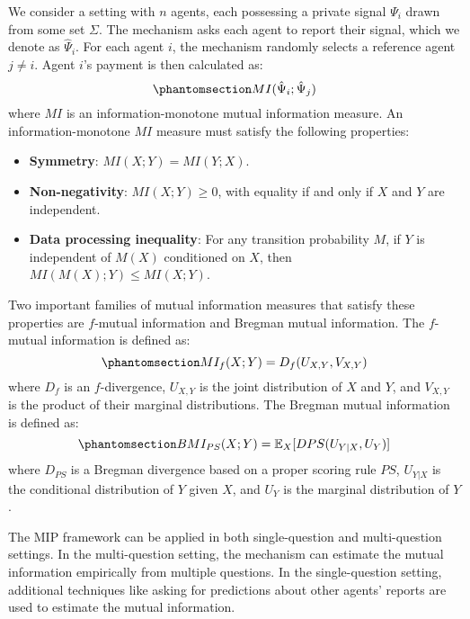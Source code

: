 \documentclass[
  letterpaper,
  numbers=noenddot,
  DIV=11]{scrreprt}
\theoremstyle{definition}
\theoremstyle{plain}
\theoremstyle{plain}
\theoremstyle{remark}
\begin{document}
We consider a setting with \(n\) agents, each possessing a private
signal \(\Psi_i\) drawn from some set \(\Sigma\). The mechanism asks
each agent to report their signal, which we denote as \(\hat{\Psi}_i\).
For each agent \(i\), the mechanism randomly selects a reference agent
\(j \neq i\). Agent \(i\)'s payment is then calculated as:
\begin{equation}\phantomsection\label{eq-eq3.68}{MI(\hat{\Psi}_i; \hat{\Psi}_j)}\end{equation}
where \(MI\) is an information-monotone mutual information measure. An
information-monotone \(MI\) measure must satisfy the following
properties:

\begin{itemize}
\item
  \textbf{Symmetry}: \(MI(X; Y) = MI(Y; X)\).
\item
  \textbf{Non-negativity}: \(MI(X; Y) \geq 0\), with equality if and
  only if \(X\) and \(Y\) are independent.
\item
  \textbf{Data processing inequality}: For any transition probability
  \(M\), if \(Y\) is independent of \(M(X)\) conditioned on \(X\), then
  \(MI(M(X); Y) \leq MI(X; Y)\).
\end{itemize}

Two important families of mutual information measures that satisfy these
properties are \(f\)-mutual information and Bregman mutual information.
The \(f\)-mutual information is defined as:
\begin{equation}\phantomsection\label{eq-eq3.69}{MI_f(X; Y) = D_f(U_{X,Y}, V_{X,Y})}\end{equation}
where \(D_f\) is an \(f\)-divergence, \(U_{X,Y}\) is the joint
distribution of \(X\) and \(Y\), and \(V_{X,Y}\) is the product of their
marginal distributions. The Bregman mutual information is defined as:
\begin{equation}\phantomsection\label{eq-eq3.70}{BMI_{PS}(X; Y) = \mathbb{E}_{X} [D{PS}(U_{Y|X}, U_Y)]}\end{equation}
where \(D_{PS}\) is a Bregman divergence based on a proper scoring rule
\(PS\), \(U_{Y|X}\) is the conditional distribution of \(Y\) given
\(X\), and \(U_Y\) is the marginal distribution of \(Y\).

The MIP framework can be applied in both single-question and
multi-question settings. In the multi-question setting, the mechanism
can estimate the mutual information empirically from multiple questions.
In the single-question setting, additional techniques like asking for
predictions about other agents' reports are used to estimate the mutual
information.
\end{document}
